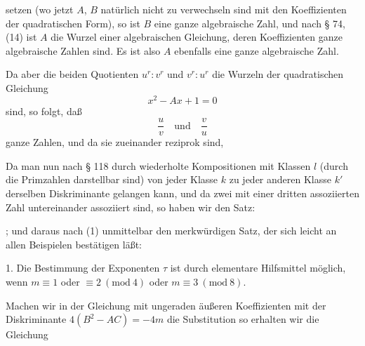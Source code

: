 setzen (wo jetzt $A$, $B$ natürlich nicht zu verwechseln sind mit den
Koeffizienten der quadratischen Form), so ist $B$ eine ganze algebraische
Zahl, und nach § 74, (14) ist $A$ die Wurzel einer algebraischen
Gleichung, deren Koeffizienten ganze algebraische Zahlen sind. Es ist
also $A$ ebenfalls eine ganze algebraische Zahl.

Da aber die beiden Quotienten $u^r:v^r$ und $v^r:u^r$ die Wurzeln der
quadratischen Gleichung
\[
x^2 - Ax + 1 = 0
\]
sind, so folgt, daß
\[
\frac{u}{v} \quad \text{und} \quad \frac{v}{u}
\]
ganze Zahlen, und da sie zueinander reziprok sind, 


Da man nun nach § 118 durch wiederholte Kompositionen mit Klassen $l$
(durch die Primzahlen darstellbar sind) von jeder Klasse $k$ zu jeder
anderen Klasse $k'$ derselben Diskriminante gelangen kann, und da zwei
mit einer dritten assoziierten Zahl untereinander assoziiert sind, so
haben wir den Satz:

; und daraus nach (1)
unmittelbar den merkwürdigen Satz, der sich leicht an allen Beispielen
bestätigen läßt:


1. Die Bestimmung der Exponenten $\tau$ ist durch elementare
Hilfsmittel möglich, wenn $m \equiv 1$ oder $\equiv 2\ (\mathrm{mod}\ 4)$
oder $m \equiv 3\ (\mathrm{mod}\ 8)$.

Machen wir in der Gleichung mit ungeraden äußeren Koeffizienten
mit der Diskriminante $4(B^2 - AC) = -4m$ die Substitution
so erhalten wir die Gleichung
